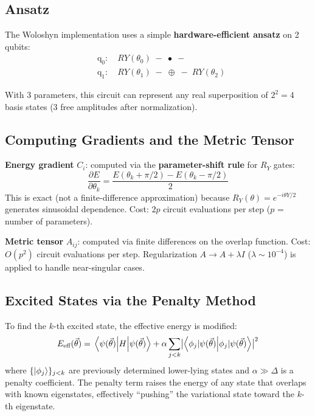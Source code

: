 \documentclass[11pt,a4paper]{article}
\begin{document}
\subsection{Ansatz}

The Woloshyn implementation uses a simple \textbf{hardware-efficient ansatz}
on 2 qubits:
\begin{equation}
  \begin{aligned}
  &\text{q}_0: \quad RY(\theta_0)\;-\;\bullet\;-\phantom{RY(\theta_2)} \\
  &\text{q}_1: \quad RY(\theta_1)\;-\;\oplus\;-\;RY(\theta_2)
  \end{aligned}
\end{equation}

With 3 parameters, this circuit can represent any real superposition of
$2^2 = 4$ basis states (3 free amplitudes after normalization).

\subsection{Computing Gradients and the Metric Tensor}

\textbf{Energy gradient} $C_i$: computed via the \textbf{parameter-shift rule}
for $R_Y$ gates:
\begin{equation}
  \frac{\partial E}{\partial\theta_k}
  = \frac{E(\theta_k+\pi/2) - E(\theta_k-\pi/2)}{2}
  \label{eq:param_shift}
\end{equation}
This is exact (not a finite-difference approximation) because $R_Y(\theta) = e^{-i\theta Y/2}$ generates sinusoidal dependence.  Cost: $2p$ circuit evaluations per step ($p$ = number of parameters).

\textbf{Metric tensor} $A_{ij}$: computed via finite differences on the
overlap function.  Cost: $O(p^2)$ circuit evaluations per step.
Regularization $A \to A + \lambda I$ ($\lambda \sim 10^{-4}$) is applied to
handle near-singular cases.

\subsection{Excited States via the Penalty Method}

To find the $k$-th excited state, the effective energy is modified:
\begin{equation}
  E_{\text{eff}}(\vec\theta)
  = \mel{\psi(\vec\theta)}{H}{\psi(\vec\theta)}
  + \alpha \sum_{j<k} \bigl|\braket{\phi_j|\psi(\vec\theta)}\bigr|^2
  \label{eq:penalty}
\end{equation}
where $\{\ket{\phi_j}\}_{j<k}$ are previously determined lower-lying states
and $\alpha \gg \Delta$ is a penalty coefficient.  The penalty term raises
the energy of any state that overlaps with known eigenstates, effectively
``pushing'' the variational state toward the $k$-th eigenstate.
\end{document}
